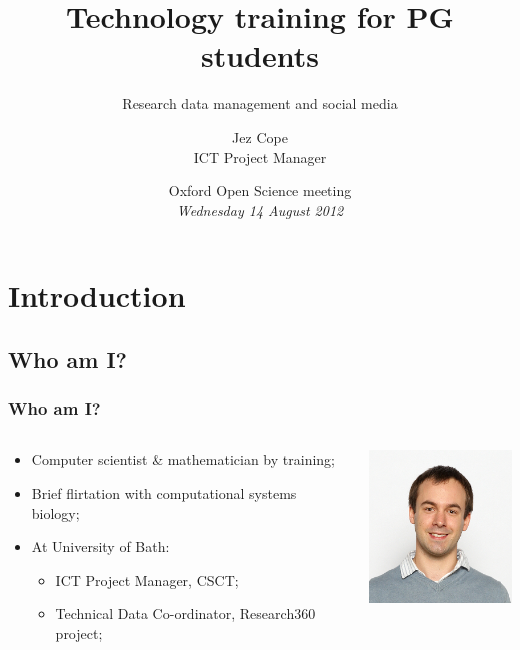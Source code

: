 \documentclass{beamer}
\title{Technology training for PG students}
\subtitle{Research data management and social media}
\author[Jez Cope]{Jez Cope\\ ICT Project Manager}
\institute[Bath]{Centre for Sustainable Chemical Technologies\\ University of Bath}
\date[14 August 2012]{Oxford Open Science meeting\\ \textit{Wednesday 14 August 2012}}
\begin{document}

\begin{frame}[plain]
  \titlepage
\end{frame}

\begin{frame}
  \tableofcontents
\end{frame}

\section{Introduction}

\subsection{Who am I?}

\begin{frame}
  \frametitle{Who am I?}
  
  \begin{columns}
    \begin{column}{6cm}
      \begin{itemize}
        \item Computer scientist \& mathematician by training;
        \item Brief flirtation with computational systems biology;
        \item At University of Bath:
          \begin{itemize}
            \item ICT Project Manager, CSCT;
            \item Technical Data Co-ordinator, Research360 project;
          \end{itemize}
      \end{itemize}
    \end{column}
    \begin{column}{4cm}
      \includegraphics[width=4cm]{COPE_Jez}
    \end{column}
  \end{columns}
\end{frame}
\end{document}
